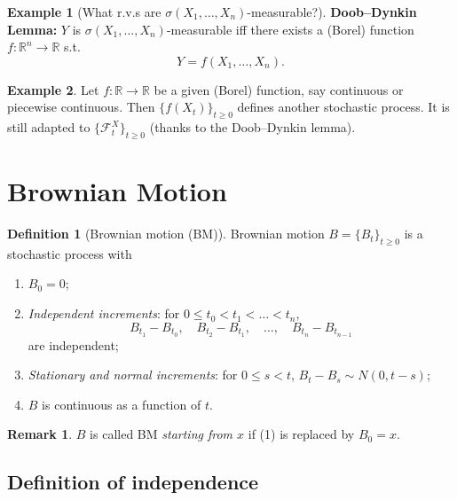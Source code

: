 \documentclass[11pt]{article}
\theoremstyle{definition}
\newtheorem{definition}{Definition}[section]
\newtheorem{example}{Example}[section]
\newtheorem{remark}{Remark}[section]
\begin{document}
\begin{example}[What r.v.s are $\sigma(X_1,\dots,X_n)$-measurable?]
\textbf{Doob--Dynkin Lemma:} $Y$ is $\sigma(X_1,\dots,X_n)$-measurable
iff there exists a (Borel) function $f : \mathbb{R}^n \to \mathbb{R}$ s.t.
\[
  Y = f(X_1, \dots, X_n).
\]
\end{example}

\begin{example}
Let $f : \mathbb{R} \to \mathbb{R}$ be a given (Borel) function, say
continuous or piecewise continuous. Then $\{f(X_t)\}_{t \ge 0}$ defines
another stochastic process. It is still adapted to
$\{\mathcal{F}^X_t\}_{t \ge 0}$ (thanks to the Doob--Dynkin lemma).
\end{example}

\section{Brownian Motion}

\begin{definition}[Brownian motion (BM)]
Brownian motion $B = \{B_t\}_{t \ge 0}$ is a stochastic process with
\begin{enumerate}
  \item[(1)] $B_0 = 0$;
  \item[(2)] \emph{Independent increments}:
        for $0 \le t_0 < t_1 < \dots < t_n$,
        \[
          B_{t_1} - B_{t_0}, \quad B_{t_2} - B_{t_1}, \quad \dots, \quad
          B_{t_n} - B_{t_{n-1}}
        \]
        are independent;
  \item[(3)] \emph{Stationary and normal increments}:
        for $0 \le s < t$, $B_t - B_s \sim N(0, t-s)$;
  \item[(4)] $B$ is continuous as a function of $t$.
\end{enumerate}
\end{definition}

\begin{remark}
$B$ is called BM \emph{starting from $x$} if (1) is replaced by $B_0 = x$.
\end{remark}

\subsection*{Definition of independence}
\end{document}
